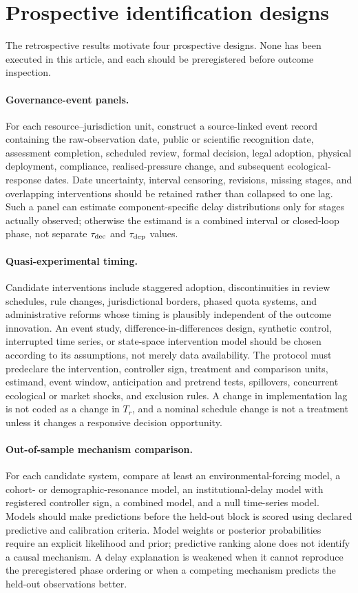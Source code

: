 \documentclass[11pt]{article}
\begin{document}
\section{Prospective identification designs}

The retrospective results motivate four prospective designs. None has been executed in this article, and each should be preregistered before outcome inspection.

\paragraph{Governance-event panels.}
For each resource--jurisdiction unit, construct a source-linked event record containing the raw-observation date, public or scientific recognition date, assessment completion, scheduled review, formal decision, legal adoption, physical deployment, compliance, realised-pressure change, and subsequent ecological-response dates. Date uncertainty, interval censoring, revisions, missing stages, and overlapping interventions should be retained rather than collapsed to one lag. Such a panel can estimate component-specific delay distributions only for stages actually observed; otherwise the estimand is a combined interval or closed-loop phase, not separate $\tau_{\rm dec}$ and $\tau_{\rm dep}$ values.

\paragraph{Quasi-experimental timing.}
Candidate interventions include staggered adoption, discontinuities in review schedules, rule changes, jurisdictional borders, phased quota systems, and administrative reforms whose timing is plausibly independent of the outcome innovation. An event study, difference-in-differences design, synthetic control, interrupted time series, or state-space intervention model should be chosen according to its assumptions, not merely data availability. The protocol must predeclare the intervention, controller sign, treatment and comparison units, estimand, event window, anticipation and pretrend tests, spillovers, concurrent ecological or market shocks, and exclusion rules. A change in implementation lag is not coded as a change in $T_r$, and a nominal schedule change is not a treatment unless it changes a responsive decision opportunity.

\paragraph{Out-of-sample mechanism comparison.}
For each candidate system, compare at least an environmental-forcing model, a cohort- or demographic-resonance model, an institutional-delay model with registered controller sign, a combined model, and a null time-series model. Models should make predictions before the held-out block is scored using declared predictive and calibration criteria. Model weights or posterior probabilities require an explicit likelihood and prior; predictive ranking alone does not identify a causal mechanism. A delay explanation is weakened when it cannot reproduce the preregistered phase ordering or when a competing mechanism predicts the held-out observations better.
\end{document}

